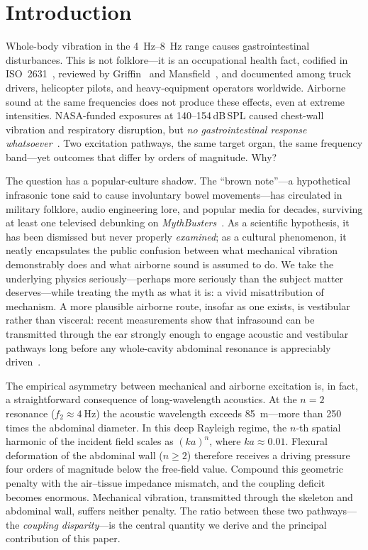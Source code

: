 \section{Introduction}
\label{sec:introduction}

Whole-body vibration in the \SIrange{4}{8}{\hertz} range causes
gastrointestinal disturbances.  This is not folklore---it is an occupational
health fact, codified in ISO~2631~\cite{iso2631}, reviewed by
Griffin~\cite{griffin1990handbook} and Mansfield~\cite{mansfield2005human},
and documented among truck drivers, helicopter pilots, and heavy-equipment
operators worldwide.  Airborne sound at the same frequencies does not produce
these effects, even at extreme intensities.  NASA-funded exposures at
140--154\,dB\,SPL caused chest-wall vibration and respiratory disruption, but
\emph{no gastrointestinal response whatsoever}~\cite{Mohr1965}.  Two
excitation pathways, the same target organ, the same frequency band---yet
outcomes that differ by orders of magnitude.  Why?

The question has a popular-culture shadow.  The ``brown note''---a
hypothetical infrasonic tone said to cause involuntary bowel movements---has
circulated in military folklore, audio engineering lore, and popular media for
decades, surviving at least one televised debunking on \emph{MythBusters}~\cite{MythBusters2005BrownNote,Leventhall2007}.
As a scientific hypothesis, it has been dismissed but never properly
\emph{examined}; as a cultural phenomenon, it neatly encapsulates the public
confusion between what mechanical vibration demonstrably does and what
airborne sound is assumed to do.  We take the underlying physics
seriously---perhaps more seriously than the subject matter
deserves---while treating the myth as what it is: a vivid misattribution
of mechanism.  A more plausible airborne route, insofar as one exists, is
vestibular rather than visceral: recent measurements show that infrasound can
be transmitted through the ear strongly enough to engage acoustic and
vestibular pathways long before any whole-cavity abdominal resonance is
appreciably driven~\cite{Raufer2018}.

The empirical asymmetry between mechanical and airborne excitation is, in
fact, a straightforward consequence of long-wavelength acoustics.  At
the $n{=}2$ resonance ($f_2 \approx \SI{4}{\hertz}$) the acoustic wavelength
exceeds \SI{85}{\metre}---more than 250 times the abdominal diameter.  In
this deep Rayleigh regime, the $n$-th spatial harmonic of the incident field
scales as $(ka)^n$, where $ka \approx 0.01$.  Flexural deformation of the
abdominal wall ($n \geq 2$) therefore receives a driving pressure four orders
of magnitude below the free-field value.  Compound this geometric penalty with the air--tissue
impedance mismatch, and the coupling deficit becomes enormous.  Mechanical
vibration, transmitted through the skeleton and abdominal wall, suffers
neither penalty.  The ratio between these two pathways---the \emph{coupling
disparity}---is the central quantity we derive and the principal contribution
of this paper.

